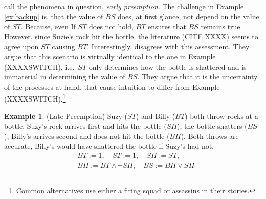 \documentclass[11pt,a4paper]{book}
\theoremstyle{definition}
\theoremstyle{definition}
\newtheorem{example}{Example}[section]
\theoremstyle{definition}
\theoremstyle{remark}
\begin{document}
\cite{bochman2018actual,batusov2018situation,beckers2018principled} call the phenomena in question, \emph{early preemption}.
The challenge in Example  \ref{ex:backup}  is, that the value of $BS$ does, at first glance, not depend on the value of $ST$. Because, even If $ST$ does not hold, $BT$ ensures that $BS$ remains true.
However, since Suzie's rock hit the bottle, the literature (CITE XXXX) seems to agree upon $ST$ causing $BT$. 
Interestingly, \cite{beckers2018principled} disagrees with this assessment. They argue that this scenario is virtually identical to the one in Example (XXXXSWITCH), i.e.\ $ST$ only determines how the bottle is shattered and is immaterial in determining the value of $BS$. They argue that it is the uncertainty of the processes at hand, that cause intuition to differ from Example (XXXXSWITCH).\footnote{Common alternatives use either a firing squad or assassins in their stories.}


\begin{example}(Late Preemption)
Suzy ($ST$) and Billy ($BT$) both throw rocks at a bottle, Suzy’s rock arrives first and hits the bottle ($SH$), the bottle shatters ($BS$), Billy’s arrives second and does not hit the bottle ($BH$). 
Both throws are accurate, Billy’s would have shattered the bottle if Suzy’s had not.
\begin{equation*}
\begin{split}
&BT:=1, \quad ST:= 1, \quad SH:=ST, \\
&BH:= BT \land \neg SH, \quad BS:= BH \lor SH
\end{split}
\end{equation*}
\begin{center}
\end{center}
\end{example}
\end{document}
